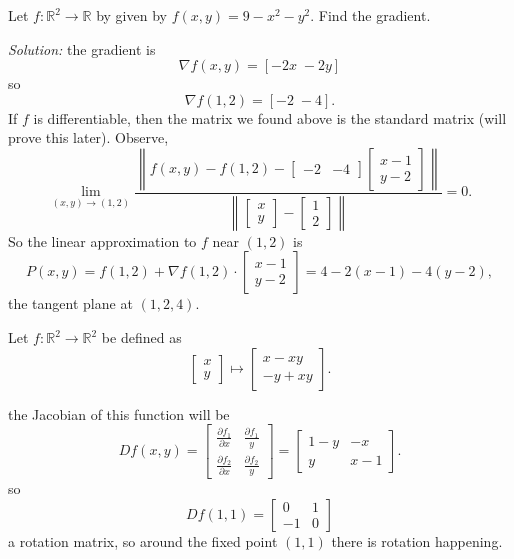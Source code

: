 \documentclass[11pt]{article}
\theoremstyle{definition}
\newcommand{\R}{\mathbb{R}}                      %
\begin{document}
\ex Let $f:\R^2\to\R$ by given by $f(x,y)=9-x^2-y^2$. Find the gradient.

\textit{Solution:} the gradient is 
$$
\nabla f(x,y)=[-2x\; -2y]
$$
so 
$$
\nabla f(1,2)= [-2\; -4].
$$
If $f$ is differentiable, then the matrix we found above is the standard matrix (will prove this later). Observe,
$$
\lim_{(x,y)\to(1,2)}\frac{\left\|f(x,y)-f(1,2)-\begin{bmatrix}
    -2&-4
\end{bmatrix}\begin{bmatrix}
    x-1\\ y-2
\end{bmatrix}\right\|}{\left\|\begin{bmatrix}
    x\\y
\end{bmatrix}-\begin{bmatrix}
    1\\2
\end{bmatrix}\right\|}=0.
$$
So the  linear approximation to $f$ near $(1,2)$ is
$$
P(x,y)=f(1,2)+\nabla f(1,2)\cdot \begin{bmatrix}
    x-1\\y-2 
\end{bmatrix} = 4-2(x-1)-4(y-2),
$$
the tangent plane at $(1,2,4)$.

\ex Let $f:\R^2\to\R^2$ be defined as
$$
\begin{bmatrix}
    x\\y
\end{bmatrix}\mapsto \begin{bmatrix}
    x-xy\\-y+xy
\end{bmatrix}.
$$

the Jacobian of this function will be
$$
Df(x,y)=\begin{bmatrix}
    \frac{\partial f_1}{\partial x}& \frac{\partial f_1}{y}\\
    \frac{\partial f_2}{\partial x}& \frac{\partial f_2}{y}
\end{bmatrix}=
\begin{bmatrix}
    1-y& -x\\
    y & x-1
\end{bmatrix}.
$$
so 
$$
Df(1,1)=\begin{bmatrix}
    0 & 1\\ -1&0
\end{bmatrix}
$$
a rotation matrix, so around the fixed point $(1,1)$ there is rotation happening.
\end{document}
